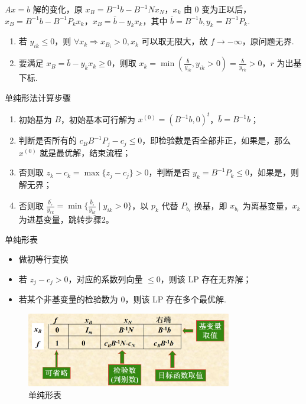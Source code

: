 \begin{note}
\begin{itemize}
            $Ax = b$ 解的变化，原 $x_B = B^{-1}b - B^{-1}Nx_N$，$x_k$ 由 0 变为正以后，$x_B = B^{-1}b - B^{-1}P_kx_k$，$x_B = \bar{b}-y_{k} x_{k}$，其中 $\bar{b} = B^{-1}b,y_k = B^{-1}P_k$.
            \begin{enumerate}
                \item 若 $y_{ik}\le 0$，则 $\forall x_k \Longrightarrow x_{B_i} > 0,x_k$ 可以取无限大，故 $f\to -\infty$，原问题无界.
                \item 要满足 $x_B = \bar{b}-y_{k} x_{k} \ge 0$，则取 $x_k = \min(\frac{\bar{b}}{y_{ik}},y_{ik}>0) = \frac{\bar{b}}{y_{rk}} > 0$，$r$ 为出基下标.
            \end{enumerate}
    \end{itemize}
\end{note}

\begin{note}
    单纯形法计算步骤
    \begin{enumerate}
        \item 初始基为 $B$，初始基本可行解为 $x^{(0)} = (B^{-1}b, 0)^t$，$\bar{b} = B^{-1}b$；
        \item 判断是否所有的 $c_BB^{-1}P_j - c_j \le 0$，即检验数是否全部非正，如果是，那么 $x^{(0)}$ 就是最优解，结束流程；
        \item 否则取 $z_k - c_k = \max\{z_j - c_j\} > 0$，判断是否 $y_k = B^{-1}P_k \le 0$，如果是，则解无界；
        \item 否则取 $\frac{\bar{b_r}}{y_{rk}} = \min\{\frac{\bar{b}_i}{y_{ik}} \mid y_{ik} > 0\}$，以 $p_k$ 代替 $P_{b_r}$ 换基，即 $x_{b_r}$ 为离基变量，$x_k$ 为进基变量，跳转步骤2。
    \end{enumerate}
\end{note}

\begin{note}
    单纯形表
    \begin{itemize}
        \item 做初等行变换
        \item 若 $z_j - c_j > 0$，对应的系数列向量 $\le 0$，则该 LP 存在无界解；
        \item 若某个非基变量的检验数为 0，则该 LP 存在多个最优解.
    \end{itemize}
    \begin{figure}[htbp]
        \centering
        \includegraphics[width=0.8\textwidth]{./figures/img1.png}
        \caption{单纯形表 \label{fig1}}
    \end{figure}
\end{note}

